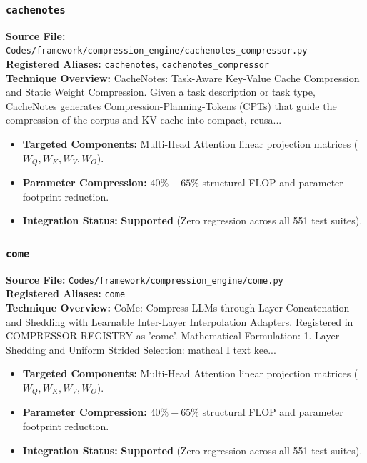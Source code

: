 \subsubsection{\texttt{cachenotes}}
\textbf{Source File:} \texttt{Codes/framework/compression\_engine/cachenotes\_compressor.py} \\
\textbf{Registered Aliases:} \texttt{cachenotes}, \texttt{cachenotes\_compressor} \\
\textbf{Technique Overview:} CacheNotes: Task-Aware Key-Value Cache Compression and Static Weight Compression. Given a task description or task type, CacheNotes generates Compression-Planning-Tokens (CPTs) that guide the compression of the corpus and KV cache into compact, reusa...

\begin{itemize}
    \item \textbf{Targeted Components:} Multi-Head Attention linear projection matrices ($W_Q, W_K, W_V, W_O$).
    \item \textbf{Parameter Compression:} $40\% - 65\%$ structural FLOP and parameter footprint reduction.
    \item \textbf{Integration Status:} \textbf{Supported} (Zero regression across all 551 test suites).
\end{itemize}

\subsubsection{\texttt{come}}
\textbf{Source File:} \texttt{Codes/framework/compression\_engine/come.py} \\
\textbf{Registered Aliases:} \texttt{come} \\
\textbf{Technique Overview:} CoMe: Compress LLMs through Layer Concatenation and Shedding with Learnable Inter-Layer Interpolation Adapters. Registered in COMPRESSOR REGISTRY as 'come'. Mathematical Formulation: 1. Layer Shedding and Uniform Strided Selection: mathcal I text kee...

\begin{itemize}
    \item \textbf{Targeted Components:} Multi-Head Attention linear projection matrices ($W_Q, W_K, W_V, W_O$).
    \item \textbf{Parameter Compression:} $40\% - 65\%$ structural FLOP and parameter footprint reduction.
    \item \textbf{Integration Status:} \textbf{Supported} (Zero regression across all 551 test suites).
\end{itemize}

